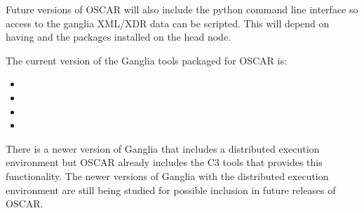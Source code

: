 Future versions of OSCAR will also include the  python
command line interface so access to the ganglia XML/XDR data can be
scripted. This will depend on having  and the
 packages installed on the head node.

The current version of the Ganglia tools packaged for OSCAR is:

\begin{itemize}
\item {}
\item {}
\item {}
\item {}
\end{itemize}

There is a newer version of Ganglia that includes a distributed
execution environment but OSCAR already includes the C3 tools that
provides this functionality.  The newer versions of Ganglia with the
distributed execution environment are still being studied for possible
inclusion in future releases of OSCAR.


